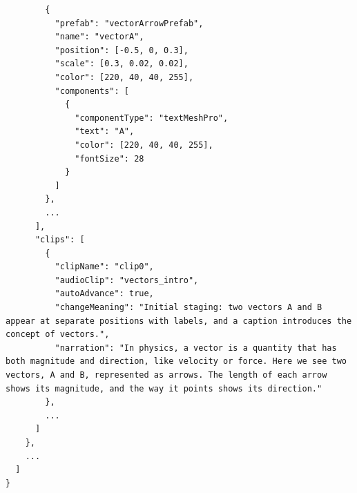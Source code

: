 \begin{lstlisting}
        {
          "prefab": "vectorArrowPrefab",
          "name": "vectorA",
          "position": [-0.5, 0, 0.3],
          "scale": [0.3, 0.02, 0.02],
          "color": [220, 40, 40, 255],
          "components": [
            {
              "componentType": "textMeshPro",
              "text": "A",
              "color": [220, 40, 40, 255],
              "fontSize": 28
            }
          ]
        },
        ...
      ],
      "clips": [
        {
          "clipName": "clip0",
          "audioClip": "vectors_intro",
          "autoAdvance": true,
          "changeMeaning": "Initial staging: two vectors A and B appear at separate positions with labels, and a caption introduces the concept of vectors.",
          "narration": "In physics, a vector is a quantity that has both magnitude and direction, like velocity or force. Here we see two vectors, A and B, represented as arrows. The length of each arrow shows its magnitude, and the way it points shows its direction."
        },
        ...
      ]
    },
    ...
  ]
}
\end{lstlisting}
